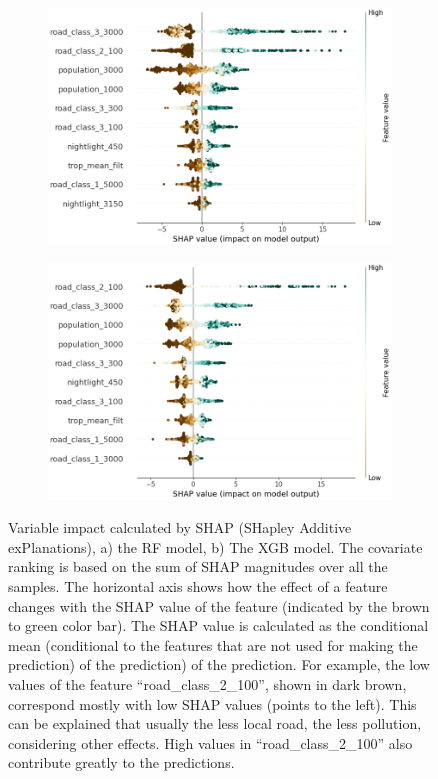 \documentclass{article}
\begin{document}
\begin{figure}
\begin{subfigure}{.5\textwidth}
  \centering
\includegraphics[scale = 0.3]{fig/rfshap.png}
  \caption{}
  \label{fig:sfig1}
\end{subfigure}%
\begin{subfigure}{.5\textwidth}
  \centering
  \includegraphics[scale = 0.3]{fig/xgbshap.png}
  \caption{}
  \label{fig:sfig2}
\end{subfigure}
\caption{Variable impact calculated by SHAP (SHapley Additive exPlanations), a) the RF model, b) The XGB model. The covariate ranking is based on the sum of SHAP magnitudes over all the samples. The horizontal axis shows how the effect of a feature changes with the SHAP value of the feature (indicated by the brown to green color bar). The SHAP value is calculated as the conditional mean (conditional to the features that are not used for making the prediction) of the prediction) of the prediction. For example, the low values of the feature “road\_class\_2\_100”, shown in dark brown, correspond mostly with low SHAP values (points to the left). This can be explained that usually the less local road, the less pollution, considering other effects. High values in “road\_class\_2\_100” also contribute greatly to the predictions.
}
\label{fig:rfxgbshap}
\end{figure}
  
\end{document}

